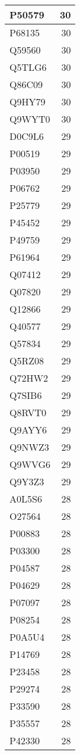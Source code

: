 \documentclass[
]{book}
\theoremstyle{definition}
\theoremstyle{definition}
\theoremstyle{definition}
\theoremstyle{definition}
\theoremstyle{remark}
\begin{document}
\begin{table}
\begin{tabular}{l|r}
\hline
P50579 & 30\\
\hline
P68135 & 30\\
\hline
Q59560 & 30\\
\hline
Q5TLG6 & 30\\
\hline
Q86C09 & 30\\
\hline
Q9HY79 & 30\\
\hline
Q9WYT0 & 30\\
\hline
D0C9L6 & 29\\
\hline
P00519 & 29\\
\hline
P03950 & 29\\
\hline
P06762 & 29\\
\hline
P25779 & 29\\
\hline
P45452 & 29\\
\hline
P49759 & 29\\
\hline
P61964 & 29\\
\hline
Q07412 & 29\\
\hline
Q07820 & 29\\
\hline
Q12866 & 29\\
\hline
Q40577 & 29\\
\hline
Q57834 & 29\\
\hline
Q5RZ08 & 29\\
\hline
Q72HW2 & 29\\
\hline
Q7SIB6 & 29\\
\hline
Q8RVT0 & 29\\
\hline
Q9AYY6 & 29\\
\hline
Q9NWZ3 & 29\\
\hline
Q9WVG6 & 29\\
\hline
Q9Y3Z3 & 29\\
\hline
A0L5S6 & 28\\
\hline
O27564 & 28\\
\hline
P00883 & 28\\
\hline
P03300 & 28\\
\hline
P04587 & 28\\
\hline
P04629 & 28\\
\hline
P07097 & 28\\
\hline
P08254 & 28\\
\hline
P0A5U4 & 28\\
\hline
P14769 & 28\\
\hline
P23458 & 28\\
\hline
P29274 & 28\\
\hline
P33590 & 28\\
\hline
P35557 & 28\\
\hline
P42330 & 28\\

\end{tabular}
\end{table}
\end{document}
